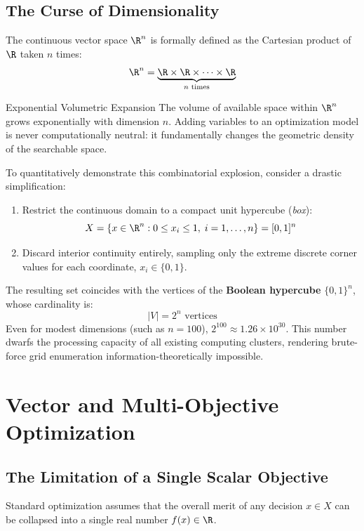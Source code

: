 \subsection{The Curse of Dimensionality}
The continuous vector space $\R^n$ is formally defined as the Cartesian product of $\R$ taken $n$ times:
\begin{equation}
\R^n = \underbrace{\R \times \R \times \dots \times \R}_{n \text{ times}}
\end{equation}

\begin{noteblock}{Exponential Volumetric Expansion}
The volume of available space within $\R^n$ grows exponentially with dimension $n$. Adding variables to an optimization model is never computationally neutral: it fundamentally changes the geometric density of the searchable space.
\end{noteblock}

To quantitatively demonstrate this combinatorial explosion, consider a drastic simplification:
\begin{enumerate}
    \item Restrict the continuous domain to a compact unit hypercube (\textit{box}):
    \begin{equation}
    X = \{x \in \R^n : 0 \le x_i \le 1, \; i = 1, \dots, n\} = [0, 1]^n
    \end{equation}
    \item Discard interior continuity entirely, sampling only the extreme discrete corner values for each coordinate, $x_i \in \{0, 1\}$.
\end{enumerate}

The resulting set coincides with the vertices of the \textbf{Boolean hypercube} $\{0, 1\}^n$, whose cardinality is:
\begin{equation}
|V| = 2^n \text{ vertices}
\end{equation}
Even for modest dimensions (such as $n = 100$), $2^{100} \approx 1.26 \times 10^{30}$. This number dwarfs the processing capacity of all existing computing clusters, rendering brute-force grid enumeration information-theoretically impossible.


\FloatBarrier
\section{Vector and Multi-Objective Optimization}
\label{sec:opt-vector-multiobjective-en}

\subsection{The Limitation of a Single Scalar Objective}
Standard optimization assumes that the overall merit of any decision $x \in X$ can be collapsed into a single real number $f(x) \in \R$. 

